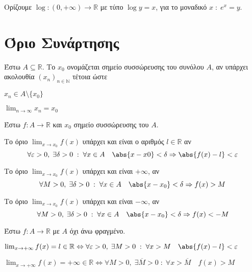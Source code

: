 \documentclass[main.tex]{subfiles}
\begin{document}
\begin{dfn}
    Ορίζουμε $ \log{} \colon (0,+ \infty) \to \mathbb{R} $ με τύπο $ \log{y} = x $, 
    για το μοναδικό $ x \; : \; e^{x} = y $.
\end{dfn}

\section{Όριο Συνάρτησης}

\begin{dfn}
    Έστω $ A \subseteq \mathbb{R} $. Το $ x_{0} $ ονομάζεται σημείο συσσώρευσης του 
    συνόλου $A$, αν υπάρχει ακολουθία $ (x_{n})_{n \in \mathbb{N}} $ τέτοια ώστε 
    \begin{myitemize}
    \item $ x_{n} \in A \setminus \{ x_{0} \} $
    \item $ \lim_{n \to \infty} x_{n} = x_{0} $
    \end{myitemize}
\end{dfn}

\begin{examples}
\end{examples}

\begin{dfn}
    Έστω $ f \colon A \to \mathbb{R} $ και $ x_{0} $ σημείο συσσώρευσης του $A$. 
    \begin{myitemize}
    \item Το όριο $ \lim_{x \to x_{0}} f(x) $ υπάρχει και είναι ο αριθμός 
        $ l \in \mathbb{R} $ αν 
        \[
            \forall \varepsilon >0, \; \exists \delta >0 \; : \; \forall x \in A \quad 
            \abs{x-x0} < \delta \Rightarrow \abs{f(x)-l} < \varepsilon
        \] 

    \item Το όριο $ \lim_{x \to x_{0}} f(x) $ υπάρχει και είναι $ + \infty $, αν
        \[
            \forall M>0, \; \exists \delta >0 \; : \; \forall x \in A 
            \quad \abs{x - x_{0}} < \delta \Rightarrow f(x) > M
        \] 

    \item Το όριο $ \lim_{x \to x_{0}} f(x) $ υπάρχει και είναι $ - \infty $, αν
        \[
            \forall M>0, \; \exists \delta >0 \; : \; \forall x \in A 
            \quad \abs{x - x_{0}} < \delta \Rightarrow f(x) < -M
        \] 
    \end{myitemize}
\end{dfn}

\begin{dfn}
    Έστω $ f \colon A \to \mathbb{R} $ με $A$ όχι άνω φραγμένο.
    \begin{myitemize}
    \item $ \lim_{x \to +\infty} f(x) = l \in \mathbb{R} \Leftrightarrow \forall 
        \varepsilon > 0, \; \exists M>0 \; : \; \forall x > M \quad 
        \abs{f(x)-l} < \varepsilon $ 
    \item $ \lim_{x \to +\infty} f(x) = + \infty \in \mathbb{R} \Leftrightarrow \forall 
        M > 0, \; \exists \overline{M} >0 \; : \; \forall x > \overline{M} \quad 
        f(x) > M $ 
    \end{myitemize}
\end{dfn}
\end{document}
